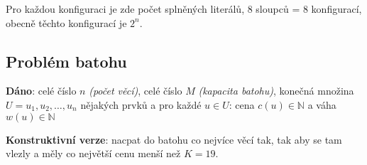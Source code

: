 Pro každou konfiguraci je zde počet splněných literálů, 8 sloupců = 8 konfigurací, obecně těchto konfigurací je $2^n$.

\subsection{Problém batohu}

\textbf{Dáno}: celé číslo $n$ \textit{(počet věcí)}, celé číslo $M$ \textit{(kapacita batohu)}, konečná množina $U = {u_1, u_2, \dots ,u_n }$ nějakých prvků a pro každé $u \in U$: cena $c(u) \in \mathbb{N}$ a váha $w(u) \in \mathbb{N}$

\textbf{Konstruktivní verze}: nacpat do batohu co nejvíce věcí tak, tak aby se tam vlezly a měly co největší cenu menší než $K = 19$.
